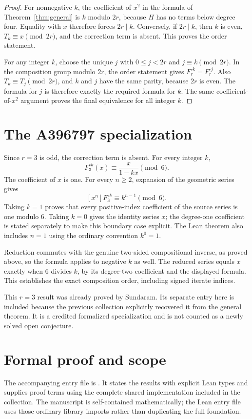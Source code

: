 \documentclass[11pt,a4paper]{article}
\theoremstyle{remark}\newtheorem{remark}[theorem]{Remark}
\begin{document}
\begin{proof}
For nonnegative $k$, the coefficient of $x^2$ in the formula of
Theorem~\ref{thm:general} is $k$ modulo $2r$, because $H$ has
no terms below degree four. Equality with $x$ therefore forces
$2r\mid k$. Conversely, if $2r\mid k$, then $k$ is even,
$T_k\equiv x\pmod{2r}$, and the correction term is absent.
This proves the order statement.

For any integer $k$, choose the unique $j$ with
$0\le j<2r$ and $j\equiv k\pmod{2r}$. In the composition group
modulo $2r$, the order statement gives
$F_r^{\circ k}=F_r^{\circ j}$. Also $T_k\equiv T_j\pmod{2r}$,
and $k$ and $j$ have the same parity, because $2r$ is even.
The formula for $j$ is therefore exactly the required formula for
$k$. The same coefficient-of-$x^2$ argument proves the final
equivalence for all integer $k$.
\end{proof}


\section{The A396797 specialization}
Since $r=3$ is odd, the correction term is absent. For
every integer $k$,
\[
F_{3}^{\circ k}(x)\equiv\frac{x}{1-kx}
\pmod{6}.
\]
The coefficient of $x$ is one. For every $n\ge2$, expansion of the
geometric series gives
\[
[x^n]F_{3}^{\circ k}\equiv k^{n-1}
\pmod{6}.
\]
Taking $k=1$ proves that every positive-index coefficient of the source
series is one modulo 6. Taking $k=0$ gives the
identity series $x$; the degree-one coefficient is stated separately
to make this boundary case explicit. The Lean theorem also includes
$n=1$ using the ordinary convention $k^0=1$.

Reduction commutes with the genuine two-sided compositional inverse,
as proved above, so the formula applies to negative $k$ as well.
The reduced series equals $x$ exactly when 6 divides
$k$, by its degree-two coefficient and the displayed formula. This
establishes the exact composition order, including signed iterate indices.

This $r=3$ result was already proved by Sundaram. Its separate entry here
is included because the previous collection explicitly recovered it from
the general theorem. It is a credited formalized specialization and is
not counted as a newly solved open conjecture.

\section{Formal proof and scope}
The accompanying entry file is .
It states the results with explicit Lean types and supplies proof terms
using the complete shared implementation included in the collection.
The manuscript is self-contained mathematically; the Lean entry file uses
those ordinary library imports rather than duplicating the full foundation.
\end{document}
